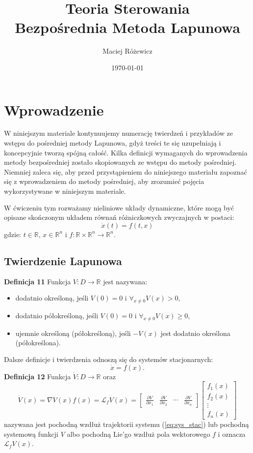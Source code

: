 \documentclass{article}
\title{
    Teoria Sterowania\\
    \Large Bezpośrednia Metoda Lapunowa
}
\author{Maciej Różewicz}
\date{\today}
\begin{document}
\maketitle

\newpage
\section{Wprowadzenie}

W niniejszym materiale kontynuujemy numerację twierdzeń i przykładów ze wstępu do pośredniej metody Lapunowa, gdyż treści te się uzupełniają i koncepcyjnie tworzą spójną całość.
Kilka definicji wymaganych do wprowadzenia metody bezpośredniej zostało skopiowanych ze wstępu do metody pośredniej. Niemniej zaleca się,
aby przed przystąpieniem do niniejszego materiału zapoznać się z wprowadzeniem do metody pośredniej, aby zrozumieć pojęcia wykorzystywane w niniejszym materiale.

W ćwiczeniu tym rozważamy nieliniowe układy dynamiczne, które mogą być opisane skończonym układem równań różniczkowych zwyczajnych w postaci:
\begin{equation}\label{eq:sys}
    \dot{x}(t) = f(t, x)
\end{equation}
gdzie: $t\in \mathbb{R}$, $x\in\mathbb{R}^{n}$ i $f: \mathbb{R} \times \mathbb{R}^{n} \rightarrow \mathbb{R}^{n}$.

\subsection{Twierdzenie Lapunowa}
\textbf{Definicja 11}
Funkcja $V: D \rightarrow \mathbb{R}$ jest nazywana:
\begin{itemize}
    \item dodatnio określoną, jeśli $V(0) = 0$ i $\forall_{x\neq 0}V(x) > 0$,
    \item dodatnio półokreśloną, jeśli $V(0) = 0$ i $\forall_{x\neq 0}V(x) \geq 0$,
    \item ujemnie określoną (półokreśloną), jeśli $-V(x)$ jest dodatnio określona (półokreślona).
\end{itemize}

Dalsze definicje i twierdzenia odnoszą się do systemów stacjonarnych:
\begin{equation}\label{eq:sys_stac}
    \dot{x} = f(x).
\end{equation}
\textbf{Definicja 12}
Funkcja $\dot{V}: D \rightarrow \mathbb{R}$ oraz 
$$
    \dot{V}(x)=\nabla V(x)f(x) = \mathcal{L}_{f}V(x) = \begin{bmatrix} \frac{\partial V}{\partial x_{1}} & \frac{\partial V}{\partial x_{2}} & \cdots & \frac{\partial V}{\partial x_{n}} \end{bmatrix}
    \begin{bmatrix} f_{1}(x) \\ f_{2}(x) \\ \vdots \\ f_{n}(x) \end{bmatrix}
$$
nazywana jest pochodną wzdłuż trajektorii systemu (\ref{eq:sys_stac}) lub pochodną systemową funkcji $V$ albo pochodną Lie'go wzdłuż pola wektorowego $f$ i oznacza $\mathcal{L}_{f}V(x)$.
\end{document}
